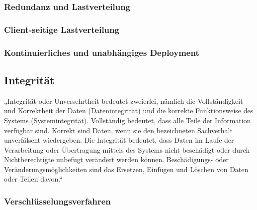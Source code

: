 \subsubsection{Redundanz und Lastverteilung}

\subsubsection{Client-seitige Lastverteilung}

\subsubsection{Kontinuierliches und unabhängiges Deployment}


\subsection{Integrität}
\label{subsec:integritaet}
„Integrität oder Unversehrtheit bedeutet zweierlei, nämlich die Vollständigkeit und Korrektheit der Daten (Datenintegrität) und die korrekte Funktionsweise des Systems (Systemintegrität). Vollständig bedeutet, dass alle Teile der Information verfügbar sind. Korrekt sind Daten, wenn sie den bezeichneten Sachverhalt unverfälscht wiedergeben. Die Integrität bedeutet, dass Daten im Laufe der Verarbeitung oder Übertragung mittels des Systems nicht beschädigt oder durch Nichtberechtigte unbefugt verändert werden können. Beschädigungs- oder Veränderungsmöglichkeiten sind das Ersetzen, Einfügen und Löschen von Daten oder Teilen davon.“ \cite{Bedner+10}

\subsubsection{Verschlüsselungsverfahren}